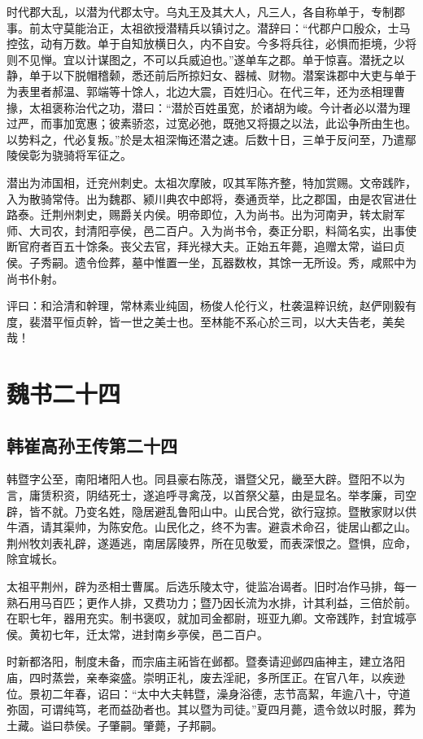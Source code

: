 \documentclass[12pt,UTF8]{ctexbook}
\begin{document}
时代郡大乱，以潜为代郡太守。乌丸王及其大人，凡三人，各自称单于，专制郡事。前太守莫能治正，太祖欲授潜精兵以镇讨之。潜辞曰：“代郡户口殷众，士马控弦，动有万数。单于自知放横日久，内不自安。今多将兵往，必惧而拒境，少将则不见惮。宜以计谋图之，不可以兵威迫也。”遂单车之郡。单于惊喜。潜抚之以静，单于以下脱帽稽颡，悉还前后所掠妇女、器械、财物。潜案诛郡中大吏与单于为表里者郝温、郭端等十馀人，北边大震，百姓归心。在代三年，还为丞相理曹掾，太祖褒称治代之功，潜曰：“潜於百姓虽宽，於诸胡为峻。今计者必以潜为理过严，而事加宽惠；彼素骄恣，过宽必弛，既弛又将摄之以法，此讼争所由生也。以势料之，代必复叛。”於是太祖深悔还潜之速。后数十日，三单于反问至，乃遣鄢陵侯彰为骁骑将军征之。

潜出为沛国相，迁兖州刺史。太祖次摩陂，叹其军陈齐整，特加赏赐。文帝践阼，入为散骑常侍。出为魏郡、颍川典农中郎将，奏通贡举，比之郡国，由是农官进仕路泰。迁荆州刺史，赐爵关内侯。明帝即位，入为尚书。出为河南尹，转太尉军师、大司农，封清阳亭侯，邑二百户。入为尚书令，奏正分职，料简名实，出事使断官府者百五十馀条。丧父去官，拜光禄大夫。正始五年薨，追赠太常，谥曰贞侯。子秀嗣。遗令俭葬，墓中惟置一坐，瓦器数枚，其馀一无所设。秀，咸熙中为尚书仆射。

评曰：和洽清和幹理，常林素业纯固，杨俊人伦行义，杜袭温粹识统，赵俨刚毅有度，裴潜平恒贞幹，皆一世之美士也。至林能不系心於三司，以大夫告老，美矣哉！

\part{魏书二十四}
\chapter{韩崔高孙王传第二十四}

韩暨字公至，南阳堵阳人也。同县豪右陈茂，谮暨父兄，畿至大辟。暨阳不以为言，庸赁积资，阴结死士，遂追呼寻禽茂，以首祭父墓，由是显名。举孝廉，司空辟，皆不就。乃变名姓，隐居避乱鲁阳山中。山民合党，欲行寇掠。暨散家财以供牛酒，请其渠帅，为陈安危。山民化之，终不为害。避袁术命召，徙居山都之山。荆州牧刘表礼辟，遂遁逃，南居孱陵界，所在见敬爱，而表深恨之。暨惧，应命，除宜城长。

太祖平荆州，辟为丞相士曹属。后选乐陵太守，徙监冶谒者。旧时冶作马排，每一熟石用马百匹；更作人排，又费功力；暨乃因长流为水排，计其利益，三倍於前。在职七年，器用充实。制书褒叹，就加司金都尉，班亚九卿。文帝践阼，封宜城亭侯。黄初七年，迁太常，进封南乡亭侯，邑二百户。

时新都洛阳，制度未备，而宗庙主祏皆在邺都。暨奏请迎邺四庙神主，建立洛阳庙，四时蒸尝，亲奉粢盛。崇明正礼，废去淫祀，多所匡正。在官八年，以疾逊位。景初二年春，诏曰：“太中大夫韩暨，澡身浴德，志节高絜，年逾八十，守道弥固，可谓纯笃，老而益劭者也。其以暨为司徒。”夏四月薨，遗令敛以时服，葬为土藏。谥曰恭侯。子肇嗣。肇薨，子邦嗣。
\end{document}
